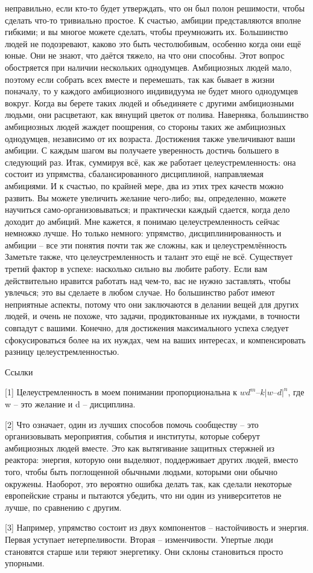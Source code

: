 \documentclass[ebook,12pt,oneside,openany]{memoir}
\begin{document}
неправильно, если кто-то будет утверждать, что он был полон решимости,
чтобы сделать что-то тривиально простое. К счастью, амбиции
представляются вполне гибкими; и вы многое можете сделать, чтобы
преумножить их. Большинство людей не подозревают, каково это быть
честолюбивым, особенно когда они ещё юные. Они не знают, что даётся
тяжело, на что они способны. Этот вопрос обостряется при наличии
нескольких однодумцев. Амбициозных людей мало, поэтому если собрать
всех вместе и перемешать, так как бывает в жизни поначалу, то у
каждого амбициозного индивидуума не будет много однодумцев вокруг.
Когда вы берете таких людей и объединяете с другими амбициозными
людьми, они расцветают, как вянущий цветок от полива. Наверняка,
большинство амбициозных людей жаждет поощрения, со стороны таких же
амбициозных однодумцев, независимо от их возраста. Достижения также
увеличивают ваши амбиции. С каждым шагом вы получаете уверенность
достичь большего в следующий раз. Итак, суммируя всё, как же работает
целеустремленность: она состоит из упрямства, сбалансированного
дисциплиной, направляемая амбициями. И к счастью, по крайней мере, два
из этих трех качеств можно развить. Вы можете увеличить желание
чего-либо; вы, определенно, можете научиться само-организовываться; и
практически каждый сдается, когда дело доходит до амбиций. Мне
кажется, я понимаю целеустремленность сейчас немножко лучше. Но только
немного: упрямство, дисциплинированность и амбиции – все эти понятия
почти так же сложны, как и целеустремлённость Заметьте также, что
целеустремленность и талант это ещё не всё. Существует третий фактор в
успехе: насколько сильно вы любите работу. Если вам действительно
нравится работать над чем-то, вас не нужно заставлять, чтобы увлечься;
это вы сделаете в любом случае. Но большинство работ имеют неприятные
аспекты, потому что они заключаются в делании вещей для других людей,
и очень не похоже, что задачи, продиктованные их нуждами, в точности
совпадут с вашими. Конечно, для достижения максимального успеха
следует сфокусироваться более на их нуждах, чем на ваших интересах, и
компенсировать разницу целеустремленностью.

Ссылки

[1] Целеустремленность в моем понимании пропорциональна к
$ wd^m – k|w – d|^n $, где w – это желание и d – дисциплина.

[2] Что означает, один из лучших способов помочь сообществу – это
организовывать мероприятия, события и институты, которые соберут
амбициозных людей вместе. Это как вытягивание защитных стержней из
реактора: энергия, которую они выделяют, поддерживает других людей,
вместо того, чтобы быть поглощенной обычными людьми, которыми они
обычно окружены. Наоборот, это вероятно ошибка делать так, как сделали
некоторые европейские страны и пытаются убедить, что ни один из
университетов не лучше, по сравнению с другим.

[3] Например, упрямство состоит из двух компонентов – настойчивость и
энергия. Первая уступает нетерпеливости. Вторая – изменчивости.
Упертые люди становятся старше или теряют энергетику. Они склоны
становиться просто упорными.
\end{document}
